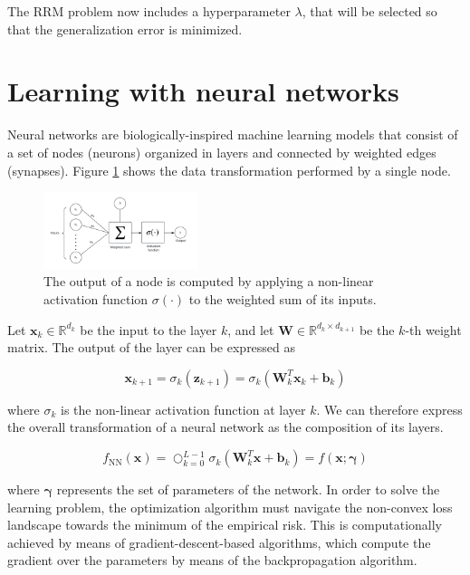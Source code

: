 The RRM problem now includes a hyperparameter $\lambda$, that will be selected so that the generalization error is minimized.

\section{Learning with neural networks}

Neural networks are biologically-inspired machine learning models that consist of a set of 
nodes (neurons) organized in layers and connected by weighted edges (synapses). Figure \ref{fig:nn_node} shows the 
data transformation performed by a single node.

\begin{figure}[H]
    \centering
    \includegraphics[width=0.4\textwidth]{img/theoretical_background/nn_node.png}
    \caption{The output of a node is computed by applying a non-linear
    activation function $\sigma(\cdot)$ to the weighted sum of its inputs.}
    \label{fig:nn_node}
\end{figure}

Let $\bm{x}_k \in \mathbb{R}^{d_k}$ be the input to the layer $k$, and let $\bm{W} \in \mathbb{R}^{d_k \times d_{k+1}}$ be the $k$-th weight matrix. The output of the layer can be expressed as

$$
\bm{x}_{k+1} = \sigma_k(\bm{z}_{k+1}) = \sigma_k(\bm{W}_k^T \bm{x}_k + \bm{b}_k)
$$

where $\sigma_k$ is the non-linear activation function at layer $k$. We can therefore express the overall transformation of a neural network
as the composition of its layers.

$$
f_{\text{NN}}(\bm{x}) = \bigcirc_{k=0}^{L-1} \sigma_k(\bm{W}_k^T \bm{x} + \bm{b}_k) = f(\bm{x}; \bm{\gamma})
$$

where $\bm{\gamma}$ represents the set of parameters of the network. In order to solve the learning problem, the optimization algorithm must navigate the non-convex loss
landscape towards the minimum of the empirical risk. This is computationally achieved by means of gradient-descent-based algorithms, which compute the
gradient over the parameters by means of the backpropagation algorithm.

